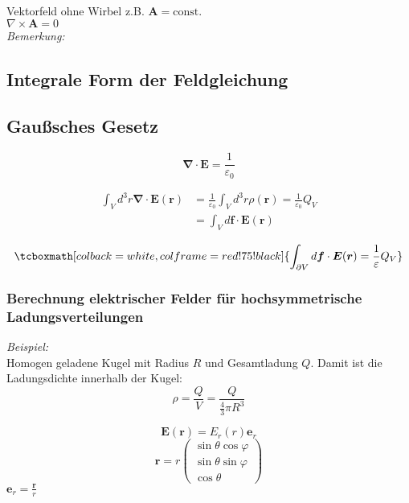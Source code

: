 \documentclass[titlepage,11pt,a4paper,ngerman]{report}
\newcommand{\tx}[1]{\textrm{#1}}
\newcommand{\const}{\tx{const.}}
\renewcommand{\vec}[1]{\boldsymbol{#1}}
\renewcommand{\epsilon}{\varepsilon}
\newcommand{\bem}{\emph{Bemerkung:}}
\newcommand{\rmbox}[1]{\tcboxmath[colback=white,colframe=red!75!black]{#1}}
\begin{document}
Vektorfeld ohne Wirbel z.B. $\vec{A} = \const$\\




$\nabla \times \vec{A} = 0$\\




\bem  %

\subsection{Integrale Form der Feldgleichung}
\subsection{Gaußsches Gesetz}
\begin{equation*}
\vec{\nabla} \cdot \vec{E} = \frac{1}{\epsilon_0}
\end{equation*}




\begin{align*}
\int_{V} d^3 r \vec{\nabla} \cdot \vec{E}(\vec{r}) &= \frac{1}{\epsilon_0} \int_{V} d^3 r \rho (\vec{r}) = \frac{1}{\epsilon_0} Q_V\\
&= \int_V d\vec{f} \cdot \vec{E}(\vec{r})
\end{align*}

\begin{equation*}
\rmbox{\int_{\partial V} d \vec{f} \cdot \vec{E}(\vec{r}) = \frac{1}{\epsilon} Q_V}
\end{equation*}

\subsubsection{Berechnung elektrischer Felder für hochsymmetrische Ladungsverteilungen}
\emph{Beispiel:}\\
Homogen geladene Kugel mit Radius $ R $ und Gesamtladung $ Q $. Damit ist die Ladungsdichte innerhalb der Kugel:
\begin{equation*}
\rho = \frac{Q}{V} = \frac{Q}{\frac{4}{3} \pi R^3}
\end{equation*}


\begin{equation*}
\vec{E}(\vec{r}) = E_r (r) \vec{e}_r
\end{equation*}
\begin{equation*}
\vec{r} = r \begin{pmatrix}
\sin \theta \cos \varphi \\ \sin \theta \sin \varphi \\ \cos \theta
\end{pmatrix}
\end{equation*}
$ \vec{e}_r = \frac{\vec{r}}{r} $
\end{document}
